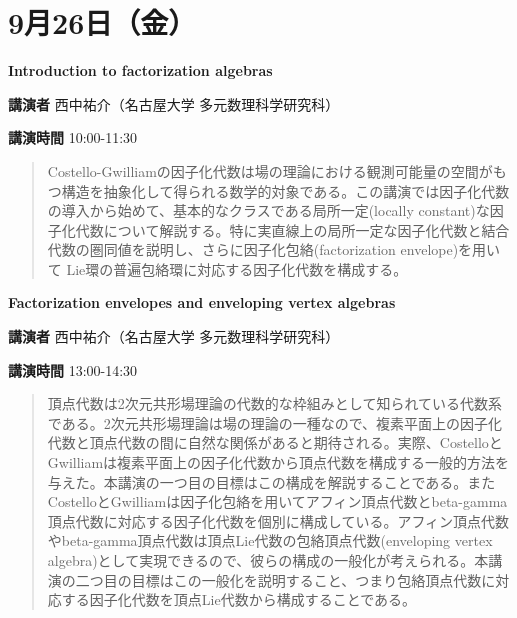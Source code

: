 \documentclass{ltjsarticle}
\theoremstyle{mystyle} %
\numberwithin{equation}{section}
\newcommand{\spkE}{西中祐介}
\newcommand{\instE}{名古屋大学 多元数理科学研究科}
\newcommand{\titleE}{Introduction to factorization algebras}
\newcommand{\titleEE}{Factorization envelopes and enveloping vertex algebras}
\newcommand{\abst}[5]{
    \Large
    \textbf{#1}
    \normalsize
    
    \vspace{10pt}

    \textbf{講演者} #2（#3）

    \textbf{講演時間} #4

    \vspace{5pt}

    \begin{quote}
        #5
    \end{quote}

    \vspace{10pt}
}
\begin{document}
\newpage

\section*{9月26日（金）}

\abst{\titleE}{\spkE}{\instE}{10:00-11:30}{
    Costello-Gwilliamの因子化代数は場の理論における観測可能量の空間がもつ構造を抽象化して得られる数学的対象である。この講演では因子化代数の導入から始めて、基本的なクラスである局所一定(locally constant)な因子化代数について解説する。特に実直線上の局所一定な因子化代数と結合代数の圏同値を説明し、さらに因子化包絡(factorization envelope)を用いて Lie環の普遍包絡環に対応する因子化代数を構成する。
}

\abst{\titleEE}{\spkE}{\instE}{13:00-14:30}{
    頂点代数は2次元共形場理論の代数的な枠組みとして知られている代数系である。2次元共形場理論は場の理論の一種なので、複素平面上の因子化代数と頂点代数の間に自然な関係があると期待される。実際、CostelloとGwilliamは複素平面上の因子化代数から頂点代数を構成する一般的方法を与えた。本講演の一つ目の目標はこの構成を解説することである。またCostelloとGwilliamは因子化包絡を用いてアフィン頂点代数とbeta-gamma頂点代数に対応する因子化代数を個別に構成している。アフィン頂点代数やbeta-gamma頂点代数は頂点Lie代数の包絡頂点代数(enveloping vertex algebra)として実現できるので、彼らの構成の一般化が考えられる。本講演の二つ目の目標はこの一般化を説明すること、つまり包絡頂点代数に対応する因子化代数を頂点Lie代数から構成することである。
}
\end{document}
